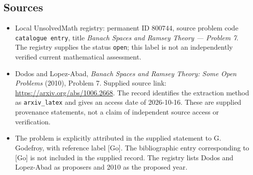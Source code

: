 \documentclass[11pt]{article}
\begin{document}
\subsection{Sources}
\begin{itemize}
\item Local UnsolvedMath registry: permanent ID \(800744\), source problem code \texttt{catalogue entry}, title \emph{Banach Spaces and Ramsey Theory --- Problem 7}. The registry supplies the status \texttt{open}; this label is not an independently verified current mathematical assessment.
\item Dodos and Lopez-Abad, \emph{Banach Spaces and Ramsey Theory: Some Open Problems} (2010), Problem 7. Supplied source link: \url{https://arxiv.org/abs/1006.2668}. The record identifies the extraction method as \texttt{arxiv\_latex} and gives an access date of 2026-10-16. These are supplied provenance statements, not a claim of independent source access or verification.
\item The problem is explicitly attributed in the supplied statement to G. Godefroy, with reference label [Go]. The bibliographic entry corresponding to [Go] is not included in the supplied record. The registry lists Dodos and Lopez-Abad as proposers and 2010 as the proposed year.
\end{itemize}
\end{document}
